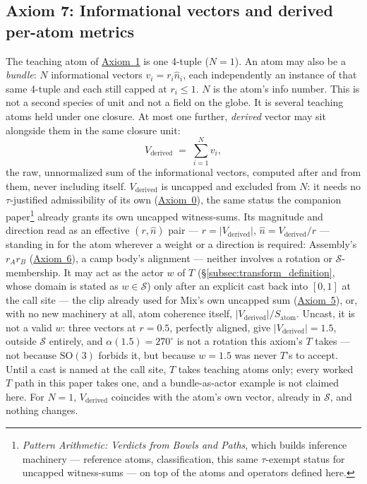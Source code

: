 \documentclass[12pt, a4paper]{article}
\begin{document}
\subsection{Axiom 7: Informational vectors and derived per-atom metrics}
\label{subsec:axiom_v1_metrics}
The teaching atom of \hyperref[subsec:axiom1]{Axiom~1} is one 4-tuple
($N=1$). An atom may also be a \emph{bundle}: $N$ informational
vectors $v_i=r_i\hat n_i$, each independently an instance of that
same 4-tuple and each still capped at $r_i\le 1$. $N$ is the atom's
info number. This is not a second species of unit and not a field
on the globe. It is several teaching atoms held under one closure. At most one
further, \emph{derived} vector may sit alongside them in the same
closure unit:
\[
V_{\text{derived}} \;=\; \sum_{i=1}^{N} v_i,
\]
the raw, unnormalized sum of the informational vectors, computed
after and from them, never including itself. $V_{\text{derived}}$ is
uncapped and excluded from $N$: it needs no $\tau$-justified
admissibility of its own (\hyperref[subsec:axiom0_admissibility]{Axiom~0}),
the same status the companion paper\footnote{\emph{Pattern
Arithmetic: Verdicts from Bowls and Paths}, which builds inference
machinery --- reference atoms, classification, this same
$\tau$-exempt status for uncapped witness-sums --- on top of the
atoms and operators defined here.} already grants its own uncapped
witness-sums. Its magnitude and direction read as an effective
$(r,\hat n)$ pair --- $r=\lvert V_{\text{derived}}\rvert$, $\hat n =
V_{\text{derived}}/r$ --- standing in for the atom wherever a weight
or a direction is required: Assembly's $r_Ar_B$
(\hyperref[subsec:axiom_assembly]{Axiom~6}), a camp body's alignment ---
neither involves a rotation or $\mathcal{S}$-membership. It may act
as the actor $w$ of $T$ (\S\ref{subsec:transform_definition}, whose
domain is stated as $w\in\mathcal{S}$) only after an explicit cast
back into $[0,1]$ at the call site --- the clip already used for
Mix's own uncapped sum (\hyperref[subsec:axiom_interference]{Axiom~5}), or,
with no new machinery at all, atom coherence itself, $\lvert
V_{\text{derived}}\rvert/S_{\text{atom}}$. Uncast, it is not a valid
$w$: three vectors at $r=0.5$, perfectly aligned, give $\lvert
V_{\text{derived}}\rvert=1.5$, outside $\mathcal{S}$ entirely, and
$\alpha(1.5)=270^\circ$ is not a rotation this axiom's $T$ takes ---
not because $\mathrm{SO}(3)$ forbids it, but because $w=1.5$ was
never $T$'s to accept. Until a cast is named at the call site, $T$
takes teaching atoms only; every worked $T$ path in this paper takes
one, and a bundle-as-actor example is not claimed here. For $N=1$,
$V_{\text{derived}}$ coincides with the atom's own vector, already
in $\mathcal{S}$, and nothing changes.
\end{document}
